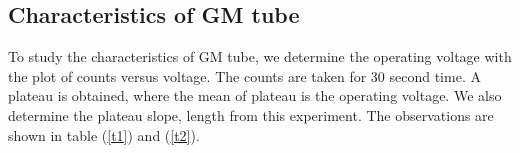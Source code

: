 \documentclass[a4paper, amsfonts, amssymb, amsmath, reprint, showkeys, nofootinbib, twoside]{revtex4-1}
\begin{document}
\subsection{Characteristics of GM tube}
To study the characteristics of GM tube, we determine the operating voltage with the plot of counts versus voltage. The counts are taken for 30 second time. A plateau is obtained, where the mean of plateau is the operating voltage. We also determine the plateau slope, length from this experiment. The observations are shown in table (\ref{t1}) and (\ref{t2}).

\begin{table}[H]
	\centering
	\caption{GM Characteristic Table for Cs-137}
	\label{t1}
\end{table}
\end{document}
